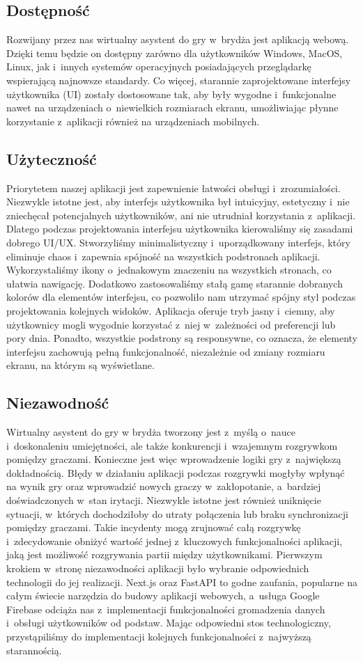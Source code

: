 \subsection{Dostępność}
Rozwijany przez nas wirtualny asystent do gry w~brydża jest aplikacją
webową. Dzięki temu będzie on dostępny zarówno dla użytkowników
Windows, MacOS, Linux, jak i~innych systemów operacyjnych posiadających
przeglądarkę wspierającą najnowsze standardy. Co więcej, starannie
zaprojektowane interfejsy użytkownika (UI) zostały dostosowane tak,
aby były wygodne i~funkcjonalne nawet na urządzeniach o~niewielkich
rozmiarach ekranu, umożliwiając płynne korzystanie z~aplikacji również
na urządzeniach mobilnych.
\subsection{Użyteczność}
Priorytetem naszej aplikacji jest zapewnienie łatwości obsługi
i~zrozumiałości. Niezwykle istotne jest, aby interfejs użytkownika
był intuicyjny, estetyczny i~nie zniechęcał potencjalnych użytkowników,
ani nie utrudniał korzystania z~aplikacji. Dlatego podczas projektowania
interfejsu użytkownika kierowaliśmy się zasadami dobrego UI/UX.
Stworzyliśmy minimalistyczny i~uporządkowany interfejs, który eliminuje
chaos i~zapewnia spójność na wszystkich podstronach aplikacji.
Wykorzystaliśmy ikony o~jednakowym znaczeniu na wszystkich stronach,
co ułatwia nawigację. Dodatkowo zastosowaliśmy stałą gamę starannie
dobranych kolorów dla elementów interfejsu, co pozwoliło nam utrzymać
spójny styl podczas projektowania kolejnych widoków. Aplikacja oferuje
tryb jasny i~ciemny, aby użytkownicy mogli wygodnie korzystać z~niej
w~zależności od preferencji lub pory dnia. Ponadto, wszystkie podstrony
są responsywne, co oznacza, że elementy interfejsu zachowują pełną
funkcjonalność, niezależnie od zmiany rozmiaru ekranu, na którym są
wyświetlane.
\subsection{Niezawodność}
Wirtualny asystent do gry w brydża tworzony jest z~myślą o~nauce
i~doskonaleniu umiejętności, ale także konkurencji i~wzajemnym
rozgrywkom pomiędzy graczami. Konieczne jest więc wprowadzenie logiki
gry z~największą dokładnością. Błędy w działaniu aplikacji podczas
rozgrywki mogłyby wpłynąć na wynik gry oraz wprowadzić nowych graczy
w~zakłopotanie, a~bardziej doświadczonych w~stan irytacji.
Niezwykle istotne jest również uniknięcie sytuacji, w~których
dochodziłoby do utraty połączenia lub braku synchronizacji pomiędzy
graczami. Takie incydenty mogą zrujnować całą rozgrywkę i~zdecydowanie
obniżyć wartość jednej z~kluczowych funkcjonalności aplikacji, jaką
jest możliwość rozgrywania partii między użytkownikami.
Pierwszym krokiem w~stronę niezawodności aplikacji było wybranie
odpowiednich technologii do jej realizacji. Next.js oraz FastAPI %
to godne zaufania, popularne na całym świecie narzędzia do budowy
aplikacji webowych, a~usługa Google Firebase odciąża nas z~implementacji
funkcjonalności gromadzenia danych i~obsługi użytkowników od podstaw.
Mając odpowiedni stos technologiczny, przystąpiliśmy do implementacji
kolejnych funkcjonalności z~najwyższą starannością.

